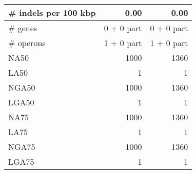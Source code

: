 \begin{table}[ht]
\begin{center}
\begin{tabular}{|l*{2}{|r}|}
\# indels per 100 kbp & 0.00 & 0.00 \\ \hline
\# genes & 0 + 0 part & 0 + 0 part \\ \hline
\# operons & 1 + 0 part & 1 + 0 part \\ \hline
NA50 & 1000 & 1360 \\ \hline
LA50 & 1 & 1 \\ \hline
NGA50 & 1000 & 1360 \\ \hline
LGA50 & 1 & 1 \\ \hline
NA75 & 1000 & 1360 \\ \hline
LA75 & 1 & 1 \\ \hline
NGA75 & 1000 & 1360 \\ \hline
LGA75 & 1 & 1 \\ \hline
\end{tabular}
\end{center}
\end{table}
